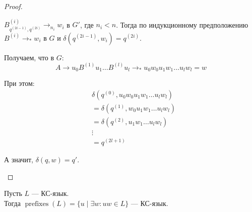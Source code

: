 \begin{proof}
\begin{itemize}
\begin{itemize}
            $B^{(i)}_{q^{(2i - 1)}, q^{(2i)}} \to_{n_i} w_i$ в $G'$, где $n_i < n$. Тогда по индукционному предположению $B^{(i)} \to_* w_i$ в $G$ и $\delta(q^{(2i - 1)}, w_i) = q^{(2i)}$.

            Получаем, что в $G$:
            $$ A \to u_0 B^{(1)} u_1 \dots B^{(l)} u_l \to_* u_0 w_0 u_1 w_1 \dots u_l w_l = w $$

            При этом:
            \begin{align*}
                & \delta(q^{(0)}, u_0 w_0 u_1 w_1 \dots u_l w_l) \\
                &= \delta(q^{(1)}, w_0 u_1 w_1 \dots u_l w_l) \\
                &= \delta(q^{(2)}, u_1 w_1 \dots u_l w_l) \\
                & \vdots \\
                &= q^{(2l + 1)}
            \end{align*}

            А значит, $\delta(q, w) = q'$.
        \end{itemize} 
    \end{itemize}
\end{proof}

\begin{theorem}
    Пусть $L$ --- КС-язык. \\ 
    Тогда $\operatorname{prefixes}(L) = \{ u \mid \exists w : uw \in L \}$ --- КС-язык.
\end{theorem}